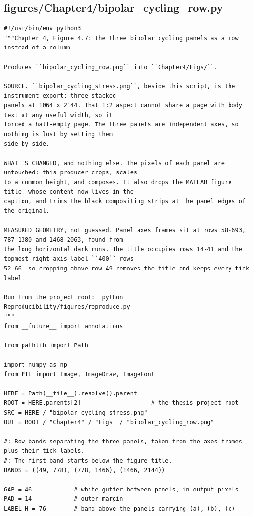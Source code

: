 \documentclass[a4paper,10pt]{article}
\begin{document}
\subsection{figures/Chapter4/bipolar\_cycling\_row.py}
\begin{Verbatim}
#!/usr/bin/env python3
"""Chapter 4, Figure 4.7: the three bipolar cycling panels as a row instead of a column.

Produces ``bipolar_cycling_row.png`` into ``Chapter4/Figs/``.

SOURCE. ``bipolar_cycling_stress.png``, beside this script, is the instrument export: three stacked
panels at 1064 x 2144. That 1:2 aspect cannot share a page with body text at any useful width, so it
forced a half-empty page. The three panels are independent axes, so nothing is lost by setting them
side by side.

WHAT IS CHANGED, and nothing else. The pixels of each panel are untouched: this producer crops, scales
to a common height, and composes. It also drops the MATLAB figure title, whose content now lives in the
caption, and trims the black compositing strips at the panel edges of the original.

MEASURED GEOMETRY, not guessed. Panel axes frames sit at rows 58-693, 787-1380 and 1468-2063, found from
the long horizontal dark runs. The title occupies rows 14-41 and the topmost right-axis label ``400`` rows
52-66, so cropping above row 49 removes the title and keeps every tick label.

Run from the project root:  python Reproducibility/figures/reproduce.py
"""
from __future__ import annotations

from pathlib import Path

import numpy as np
from PIL import Image, ImageDraw, ImageFont

HERE = Path(__file__).resolve().parent
ROOT = HERE.parents[2]                    # the thesis project root
SRC = HERE / "bipolar_cycling_stress.png"
OUT = ROOT / "Chapter4" / "Figs" / "bipolar_cycling_row.png"

#: Row bands separating the three panels, taken from the axes frames plus their tick labels.
#: The first band starts below the figure title.
BANDS = ((49, 778), (778, 1466), (1466, 2144))

GAP = 46            # white gutter between panels, in output pixels
PAD = 14            # outer margin
LABEL_H = 76        # band above the panels carrying (a), (b), (c)



\end{Verbatim}
\end{document}
